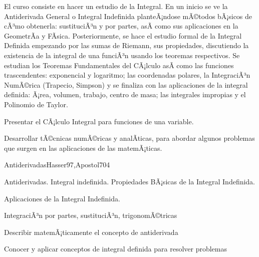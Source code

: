 \begin{syllabus}


\begin{justification}
El curso consiste en hacer un estudio de la Integral. En un inicio se ve la Antiderivada General o Integral Indefinida planteÃ¡ndose mÃ©todos bÃ¡sicos de cÃ³mo obtenerla: sustituciÃ³n y por partes, asÃ­ como sus aplicaciones en la GeometrÃ­a y FÃ­sica. Posteriormente, se hace el estudio formal de la Integral Definida empezando por las sumas de Riemann, sus propiedades, discutiendo la existencia de la integral de una funciÃ³n usando los teoremas respectivos. Se estudian los Teoremas Fundamentales del CÃ¡lculo asÃ­ como las funciones trascendentes: exponencial y logaritmo; las coordenadas polares, la IntegraciÃ³n NumÃ©rica (Trapecio, Simpson) y se finaliza con las aplicaciones de la integral definida: Ã¡rea, volumen, trabajo, centro de masa; las integrales impropias y el Polinomio de Taylor.
\end{justification}

\begin{goals}
\item Presentar el CÃ¡lculo Integral para funciones de una variable.
\item Desarrollar tÃ©cnicas numÃ©ricas y analÃ­ticas, para abordar algunos problemas que surgen en las aplicaciones de las matemÃ¡ticas.
\end{goals}

\begin{outcomes}
\end{outcomes}

\begin{unit}{Antiderivadas}{Hasser97,Apostol70}{4}
\begin{topics}
      \item Antiderivadas. Integral indefinida. Propiedades BÃ¡sicas de la  Integral Indefinida.
      \item Aplicaciones de la Integral Indefinida.
      \item IntegraciÃ³n por partes,  sustituciÃ³n, trigonomÃ©tricas
   \end{topics}

   \begin{unitgoals}
      \item Describir matemÃ¡ticamente el concepto de antiderivada
      \item Conocer y aplicar conceptos de integral definida para resolver problemas
   \end{unitgoals}
\end{unit}


\end{syllabus}
